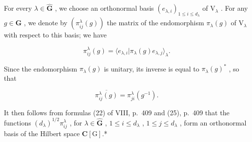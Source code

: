 For every \(\lambda \in \widehat{\mathbf{G}}\) , we choose an orthonormal basis \((e_{\lambda,i})_{1\leqslant i\leqslant d_{\lambda}}\) of \(\mathrm{V}_{\lambda}\) . For any \(g\in \mathbf{G}\) , we denote by \((\pi_{ij}^{\lambda}(g))\) the matrix of the endomorphism \(\pi_{\lambda}(g)\) of \(\mathrm{V}_{\lambda}\) with respect to this basis; we have

\[
\pi_ {i j} ^ {\lambda} (g) = \langle e _ {\lambda , i} | \pi_ {\lambda} (g) e _ {\lambda , j} \rangle_ {\lambda}.\tag{59}
\]

Since the endomorphism \(\pi_{\lambda}(g)\) is unitary, its inverse is equal to \(\pi_{\lambda}(g)^*\) , so that

\[
\overline {{\pi_ {i j} ^ {\lambda} (g)}} = \pi_ {j i} ^ {\lambda} (g ^ {- 1}).\tag{60}
\]

It then follows from formulas (22) of VIII, p.~409 and (25), p.~409 that the functions \((d_{\lambda})^{1 / 2}\pi_{ij}^{\lambda}\) , for \(\lambda \in \widehat{\mathbf{G}}\) , \(1\leqslant i\leqslant d_{\lambda}\) , \(1\leqslant j\leqslant d_{\lambda}\) , form an orthonormal basis of the Hilbert space \(\mathbf{C}[\mathrm{G}]\).*

